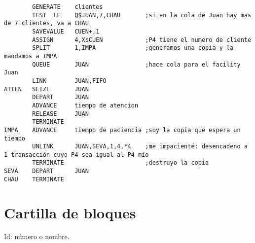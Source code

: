 \documentclass[12pt, a4paper, twoside]{paquetes-apunte/apunte}
\begin{document}
\begin{lstlisting}
        GENERATE    clientes
        TEST  LE    Q$JUAN,7,CHAU       ;si en la cola de Juan hay mas de 7 clientes, va a CHAU
        SAVEVALUE   CUEN+,1
        ASSIGN      4,X$CUEN            ;P4 tiene el numero de cliente
        SPLIT       1,IMPA              ;generamos una copia y la mandamos a IMPA
        QUEUE       JUAN                ;hace cola para el facility Juan
        LINK        JUAN,FIFO
ATIEN   SEIZE       JUAN
        DEPART      JUAN
        ADVANCE     tiempo de atencion
        RELEASE     JUAN
        TERMINATE
IMPA    ADVANCE     tiempo de paciencia ;soy la copia que espera un tiempo
        UNLINK      JUAN,SEVA,1,4,*4    ;me impacienté: desencadeno a 1 transacción cuyo P4 sea igual al P4 mío
        TERMINATE                       ;destruyo la copia
SEVA    DEPART      JUAN
CHAU    TERMINATE
\end{lstlisting}


\newpage

\section{Cartilla de bloques}

Id: número o nombre.
\end{document}
